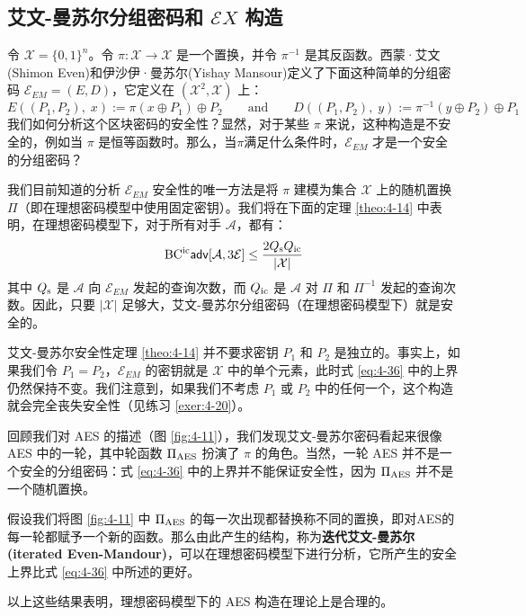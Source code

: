 \subsection{艾文-曼苏尔分组密码和 $\mathcal{E}X$ 构造}

令 $\mathcal{X}=\{0,1\}^n$。令 $\pi:\mathcal{X}\to\mathcal{X}$ 是一个置换，并令 $\pi^{-1}$ 是其反函数。西蒙·艾文(Shimon Even)和伊沙伊·曼苏尔(Yishay Mansour)定义了下面这种简单的分组密码 $\mathcal{E}_{EM}=(E,D)$，它定义在 $(\mathcal{X}^2,\mathcal{X})$ 上：
\begin{equation}\label{eq:4-35}
E((P_1,P_2),\;x):=\pi(x\oplus P_1)\oplus P_2
\quad\quad\text{and}\quad\quad
D((P_1,P_2),\;y):=\pi^{-1}(y\oplus P_2)\oplus P_1
\end{equation}
我们如何分析这个区块密码的安全性？显然，对于某些 $\pi$ 来说，这种构造是不安全的，例如当 $\pi$ 是恒等函数时。那么，当$\pi$满足什么条件时，$\mathcal{E}_{EM}$ 才是一个安全的分组密码？

我们目前知道的分析 $\mathcal{E}_{EM}$ 安全性的唯一方法是将 $\pi$ 建模为集合 $\mathcal{X}$ 上的随机置换 $\Pi$（即在理想密码模型中使用固定密钥）。我们将在下面的定理 \ref{theo:4-14} 中表明，在理想密码模型下，对于所有对手 $\mathcal{A}$，都有：
\begin{equation}\label{eq:4-36}
{\rm BC^{ic}\mathsf{adv}}[\mathcal{A},3\mathcal{E}]\leq\frac{2Q_{\rm s}Q_{\rm ic}}{|\mathcal{X}|}
\end{equation}
其中 $Q_{\rm s}$ 是 $\mathcal{A}$ 向 $\mathcal{E}_{EM}$ 发起的查询次数，而 $Q_{\rm ic}$ 是 $\mathcal{A}$ 对 $\Pi$ 和 $\Pi^{-1}$ 发起的查询次数。因此，只要 $|\mathcal{X}|$ 足够大，艾文-曼苏尔分组密码（在理想密码模型下）就是安全的。

艾文-曼苏尔安全性定理 \ref{theo:4-14} 并不要求密钥 $P_1$ 和 $P_2$ 是独立的。事实上，如果我们令 $P_1=P_2$，$\mathcal{E}_{EM}$ 的密钥就是 $\mathcal{X}$ 中的单个元素，此时式 \ref{eq:4-36} 中的上界仍然保持不变。我们注意到，如果我们不考虑 $P_1$ 或 $P_2$ 中的任何一个，这个构造就会完全丧失安全性（见练习 \ref{exer:4-20}）。

\begin{snote}
回顾我们对 AES 的描述（图 \ref{fig:4-11}），我们发现艾文-曼苏尔密码看起来很像 AES 中的一轮，其中轮函数 $\Pi_{\rm AES}$ 扮演了 $\pi$ 的角色。当然，一轮 AES 并不是一个安全的分组密码：式 \ref{eq:4-36} 中的上界并不能保证安全性，因为 $\Pi_{\rm AES}$ 并不是一个随机置换。

假设我们将图 \ref{fig:4-11} 中 $\Pi_{\rm AES}$ 的每一次出现都替换称不同的置换，即对AES的每一轮都赋予一个新的函数。那么由此产生的结构，称为\textbf{迭代艾文-曼苏尔 (iterated Even-Mandour)}，可以在理想密码模型下进行分析，它所产生的安全上界比式 \ref{eq:4-36} 中所述的更好。

以上这些结果表明，理想密码模型下的 AES 构造在理论上是合理的。
\end{snote}

